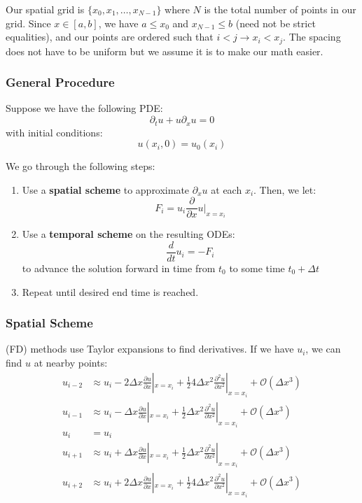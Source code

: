 \documentclass{article}
\begin{document}
Our spatial grid is \(\{x_0, x_1, \dots, x_{N-1}\}\) where \(N\) is the total number of points in our grid. Since \(x\in [a,b]\), we have \(a\leq x_0\) and \(x_{N-1}\leq b\) (need not be strict equalities), and our points are ordered such that
\(i<j\rightarrow x_i<x_j\). The spacing does not have to be uniform but we assume it is to make our math easier.

\subsubsection{General Procedure}
Suppose we have the following PDE:
\[
    \partial_t u+u \partial_x u=0
\]
with initial conditions:
\[
    u(x_i, 0)=u_0(x_i)
\]

We go through the following steps:
\begin{enumerate}
    \item Use a \textbf{spatial scheme} to approximate \(\partial_x u\) at each \(x_i\). Then, we let:
    \[
        F_i=u_i \frac{\partial}{\partial x}u|_{x=x_i}
    \]
    \item Use a \textbf{temporal scheme} on the resulting ODEs:
    \[
        \frac{d}{dt}u_i=-F_i        
    \]
    to advance the solution forward in time from \(t_0\) to some time \(t_0+\Delta t\)  
    \item Repeat until desired end time is reached.
\end{enumerate}

\subsubsection{Spatial Scheme}
 (FD) methods use Taylor expansions to find derivatives. If we have \(u_i\), we can find \(u\) at nearby points:
\begin{align*}
    u_{i-2}&\approx u_i-2\Delta x \frac{\partial u}{\partial x}|_{x=x_i}+\frac{1}{2}4 \Delta x^2 \frac{\partial^2 u}{\partial x^2}|_{x=x_i}+\mathscr{O}(\Delta x^3) \\
    u_{i-1}&\approx u_i-\Delta x \frac{\partial u}{\partial x}|_{x=x_i}+\frac{1}{2} \Delta x^2 \frac{\partial^2 u}{\partial x^2}|_{x=x_i}+\mathscr{O}(\Delta x^3) \\
    u_i&=u_i \\
    u_{i+1}&\approx u_i+\Delta x \frac{\partial u}{\partial x}|_{x=x_i}+\frac{1}{2}\Delta x^2 \frac{\partial^2 u}{\partial x^2}|_{x=x_i}+\mathscr{O}(\Delta x^3) \\
    u_{i+2}&\approx u_i + 2 \Delta x \frac{\partial u}{\partial x}|_{x=x_i}+\frac{1}{2}4 \Delta x^2 \frac{\partial ^2 u}{\partial x^2}|_{x=x_i}+\mathscr{O}(\Delta x^3)
\end{align*}
\end{document}
